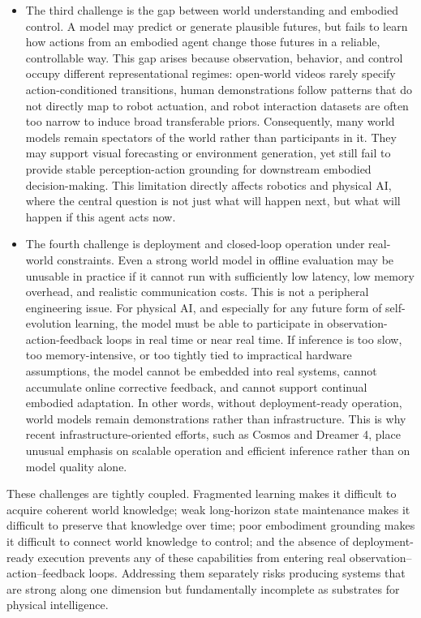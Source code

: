 \documentclass{llmxive}
\begin{document}
\begin{itemize}
\item The third challenge is the gap between world understanding and embodied control. A model may predict or generate plausible futures, but fails to learn how actions from an embodied agent change those futures in a reliable, controllable way. This gap arises because observation, behavior, and control occupy different representational regimes: open-world videos rarely specify action-conditioned transitions, human demonstrations follow patterns that do not directly map to robot actuation, and robot interaction datasets are often too narrow to induce broad transferable priors. Consequently, many world models remain spectators of the world rather than participants in it. They may support visual forecasting or environment generation, yet still fail to provide stable perception-action grounding for downstream embodied decision-making. This limitation directly affects robotics and physical AI, where the central question is not just what will happen next, but what will happen if this agent acts now.

\item The fourth challenge is deployment and closed-loop operation under real-world constraints. Even a strong world model in offline evaluation may be unusable in practice if it cannot run with sufficiently low latency, low memory overhead, and realistic communication costs. This is not a peripheral engineering issue. For physical AI, and especially for any future form of self-evolution learning, the model must be able to participate in observation-action-feedback loops in real time or near real time. If inference is too slow, too memory-intensive, or too tightly tied to impractical hardware assumptions, the model cannot be embedded into real systems, cannot accumulate online corrective feedback, and cannot support continual embodied adaptation. In other words, without deployment-ready operation, world models remain demonstrations rather than infrastructure. This is why recent infrastructure-oriented efforts, such as Cosmos and Dreamer 4, place unusual emphasis on scalable operation and efficient inference rather than on model quality alone.
\end{itemize}



These challenges are tightly coupled. Fragmented learning makes it difficult to acquire coherent world knowledge; weak long-horizon state maintenance makes it difficult to preserve that knowledge over time; poor embodiment grounding makes it difficult to connect world knowledge to control; and the absence of deployment-ready execution prevents any of these capabilities from entering real observation–action–feedback loops. Addressing them separately risks producing systems that are strong along one dimension but fundamentally incomplete as substrates for physical intelligence.
\end{document}
